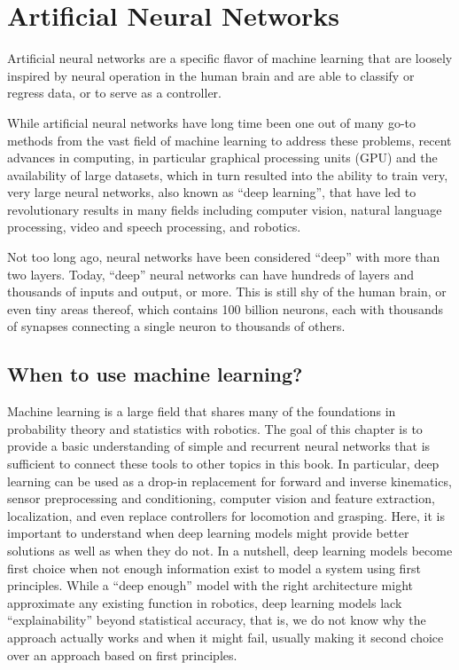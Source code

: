 \chapter{Artificial Neural Networks}
Artificial neural networks are a specific flavor of machine learning that are loosely inspired by neural operation in the human brain and are able to classify or regress data, or to serve as a controller.

While artificial neural networks have long time been one out of many go-to methods from the vast field of machine learning to address these problems, recent advances in computing, in particular graphical processing units (GPU) and the availability of large datasets, which in turn resulted into the ability to train very, very large neural networks, also known as ``deep learning'', that have led to revolutionary results in many fields including computer vision, natural language processing, video and speech processing, and robotics.

Not too long ago, neural networks have been considered ``deep'' with more than two layers. Today, ``deep'' neural networks can have hundreds of layers and thousands of inputs and output, or more. This is still shy of the human brain, or even tiny areas thereof, which contains 100 billion neurons, each with thousands of synapses connecting a single neuron to thousands of others.

\section{When to use machine learning?}
Machine learning is a large field that shares many of the foundations in probability theory and statistics with robotics. The goal of this chapter is to provide a basic understanding of simple and recurrent neural networks that is sufficient to connect these tools to other topics in this book. In particular, deep learning can be used as a drop-in replacement for forward and inverse kinematics, sensor preprocessing and conditioning, computer vision and feature extraction, localization, and even replace controllers for locomotion and grasping. Here, it is important to understand when deep learning models might provide better solutions as well as when they do not. In a nutshell, deep learning models become first choice when not enough information exist to model a system using first principles. While a ``deep enough'' model with the right architecture might approximate any existing function in robotics, deep learning models lack ``explainability'' beyond statistical accuracy, that is, we do not know why the approach actually works and when it might fail, usually making it second choice over an approach based on first principles.


